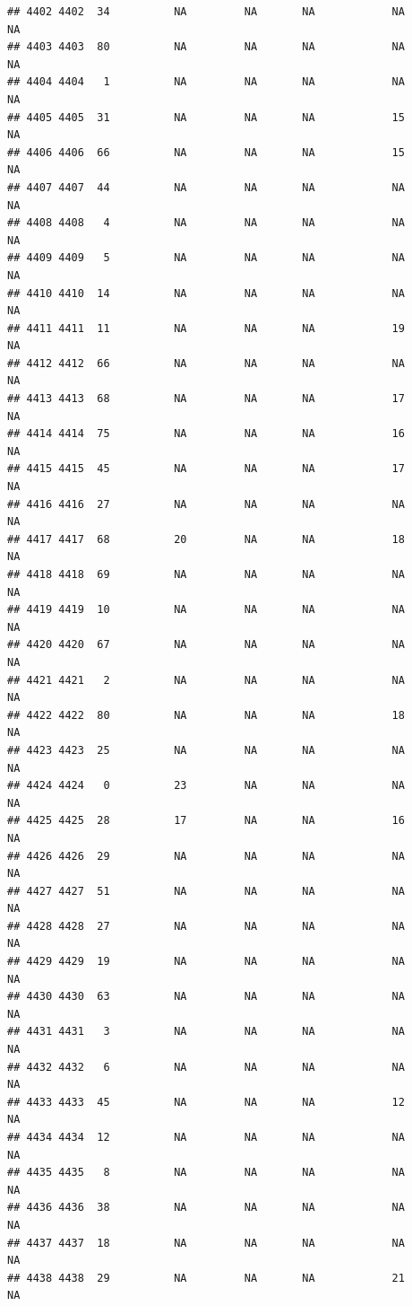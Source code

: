 \documentclass[man]{apa6}
\begin{document}
\begin{verbatim}
## 4402 4402  34          NA         NA       NA            NA       NA
## 4403 4403  80          NA         NA       NA            NA       NA
## 4404 4404   1          NA         NA       NA            NA       NA
## 4405 4405  31          NA         NA       NA            15       NA
## 4406 4406  66          NA         NA       NA            15       NA
## 4407 4407  44          NA         NA       NA            NA       NA
## 4408 4408   4          NA         NA       NA            NA       NA
## 4409 4409   5          NA         NA       NA            NA       NA
## 4410 4410  14          NA         NA       NA            NA       NA
## 4411 4411  11          NA         NA       NA            19       NA
## 4412 4412  66          NA         NA       NA            NA       NA
## 4413 4413  68          NA         NA       NA            17       NA
## 4414 4414  75          NA         NA       NA            16       NA
## 4415 4415  45          NA         NA       NA            17       NA
## 4416 4416  27          NA         NA       NA            NA       NA
## 4417 4417  68          20         NA       NA            18       NA
## 4418 4418  69          NA         NA       NA            NA       NA
## 4419 4419  10          NA         NA       NA            NA       NA
## 4420 4420  67          NA         NA       NA            NA       NA
## 4421 4421   2          NA         NA       NA            NA       NA
## 4422 4422  80          NA         NA       NA            18       NA
## 4423 4423  25          NA         NA       NA            NA       NA
## 4424 4424   0          23         NA       NA            NA       NA
## 4425 4425  28          17         NA       NA            16       NA
## 4426 4426  29          NA         NA       NA            NA       NA
## 4427 4427  51          NA         NA       NA            NA       NA
## 4428 4428  27          NA         NA       NA            NA       NA
## 4429 4429  19          NA         NA       NA            NA       NA
## 4430 4430  63          NA         NA       NA            NA       NA
## 4431 4431   3          NA         NA       NA            NA       NA
## 4432 4432   6          NA         NA       NA            NA       NA
## 4433 4433  45          NA         NA       NA            12       NA
## 4434 4434  12          NA         NA       NA            NA       NA
## 4435 4435   8          NA         NA       NA            NA       NA
## 4436 4436  38          NA         NA       NA            NA       NA
## 4437 4437  18          NA         NA       NA            NA       NA
## 4438 4438  29          NA         NA       NA            21       NA

\end{verbatim}
\end{document}

